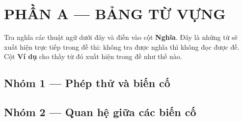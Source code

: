 \documentclass[11pt, a4paper]{article}
\begin{document}

\section{PHẦN A — BẢNG TỪ VỰNG}

Tra nghĩa các thuật ngữ dưới đây và điền vào cột \textbf{Nghĩa}. Đây là những từ sẽ xuất hiện trực tiếp trong đề thi: không tra được nghĩa thì không đọc được đề. Cột \textbf{Ví dụ} cho thấy từ đó xuất hiện trong đề như thế nào.

\subsection{Nhóm 1 — Phép thử và biến cố}


\subsection{Nhóm 2 — Quan hệ giữa các biến cố}
\end{document}
